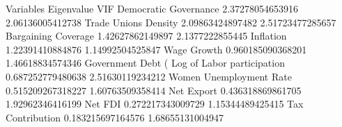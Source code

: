 Variables	Eigenvalue	VIF
Democratic Governance	2.37278054653916	2.06136005412738
Trade Unions Density	2.09863424897482	2.51723477285657
Bargaining Coverage	1.42627862149897	2.1377222855445
Inflation	1.22391410884876	1.14992504525847
Wage Growth	0.960185090368201	1.46618834574346
Government Debt (%
Log of Labor participation	0.687252779480638	2.51630119234212
Women Unemployment Rate	0.515209267318227	1.60763509358414
Net Export	0.436318869861705	1.92962346416199
Net FDI	0.272217343009729	1.15344489425415
Tax Contribution	0.183215697164576	1.68655131004947
